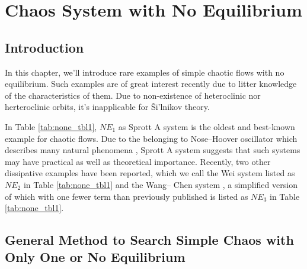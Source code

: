 \chapter{Chaos System with No Equilibrium}
\label{chap:chaosnoneequi}

\section{Introduction}

In this chapter, we'll introduce rare examples of simple chaotic flows with no
equilibrium. Such examples are of great interest recently due to litter
knowledge of the characteristics of them. Due to non-existence of
heteroclinic nor herteroclinic orbits, it's inapplicable for \v{S}i'lnikov theory.

In Table \ref{tab:none_tbl1}, $NE_1$ as Sprott A system \cite{Sprott1994Some} is the
oldest and best-known example for chaotic flows. Due to the belonging to 
Nose–Hoover oscillator \cite{Hoover1995Remark} which describes
many natural phenomena \cite{Posch1986Canonical}, Sprott A system suggests that
such systems may have practical as well as theoretical importance. Recently,
two other dissipative examples have been reported, which
we call the Wei system \cite{Wei2011Dynamical} listed as $NE_2$ in Table \ref{tab:none_tbl1} and the Wang–
Chen system \cite{Wang2012Constructing}, a simplified version of which with one fewer
term than previously published is listed as $NE_3$ in Table \ref{tab:none_tbl1}.
 
\section{General Method to Search Simple Chaos with Only One or No Equilibrium}
\label{sec:none_gen_met}

